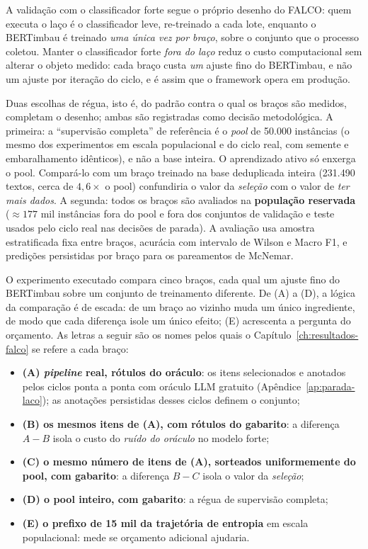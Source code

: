 A validação com o classificador forte segue o próprio desenho do FALCO: quem
executa o laço é o classificador leve, re-treinado a cada lote, enquanto o
BERTimbau é treinado \emph{uma única vez por braço}, sobre o conjunto que o
processo coletou. Manter o classificador forte \emph{fora do laço} reduz o
custo computacional sem alterar o objeto medido: cada braço custa \emph{um}
ajuste fino do BERTimbau, e não um ajuste por iteração do ciclo, e é assim
que o framework opera em produção.

Duas escolhas de régua, isto é, do padrão contra o qual os braços são
medidos, completam o desenho; ambas são registradas como decisão
metodológica. A primeira: a ``supervisão completa'' de referência é o
\emph{pool} de 50.000 instâncias (o mesmo dos experimentos em escala
populacional e do ciclo real, com semente e embaralhamento idênticos), e não a
base inteira. O aprendizado ativo só enxerga o pool. Compará-lo com um braço
treinado na base deduplicada inteira (231.490 textos, cerca de $4{,}6\times$ o
pool) confundiria o valor da \emph{seleção} com o valor de \emph{ter mais
dados}. A segunda: todos os braços são avaliados na \textbf{população
reservada} ($\approx 177$ mil instâncias fora do pool e fora dos conjuntos de
validação e teste usados pelo ciclo real nas decisões de parada). A avaliação
usa amostra estratificada fixa entre braços, acurácia com intervalo de Wilson e
Macro F1, e predições persistidas por braço para os pareamentos de McNemar.

O experimento executado compara cinco braços, cada qual um ajuste fino do
BERTimbau sobre um conjunto de treinamento diferente. De (A) a (D), a lógica da
comparação é de escada: de um braço ao vizinho muda um único ingrediente, de
modo que cada diferença isole um único efeito; (E) acrescenta a pergunta do
orçamento. As letras a seguir são os nomes pelos quais o
Capítulo~\ref{ch:resultados-falco} se refere a cada braço:

\begin{itemize}
  \item \textbf{(A) \emph{pipeline} real, rótulos do oráculo}: os itens
  selecionados e anotados pelos ciclos ponta a ponta com oráculo LLM gratuito
  (Apêndice~\ref{ap:parada-laco}); as anotações persistidas desses ciclos
  definem o conjunto;
  \item \textbf{(B) os mesmos itens de (A), com rótulos do gabarito}: a
  diferença $A{-}B$ isola o custo do \emph{ruído do oráculo} no modelo forte;
  \item \textbf{(C) o mesmo número de itens de (A), sorteados uniformemente do
  pool, com gabarito}: a diferença $B{-}C$ isola o valor da \emph{seleção};
  \item \textbf{(D) o pool inteiro, com gabarito}: a régua de supervisão
  completa;
  \item \textbf{(E) o prefixo de 15 mil da trajetória de entropia} em escala
  populacional: mede se orçamento adicional ajudaria.
\end{itemize}


